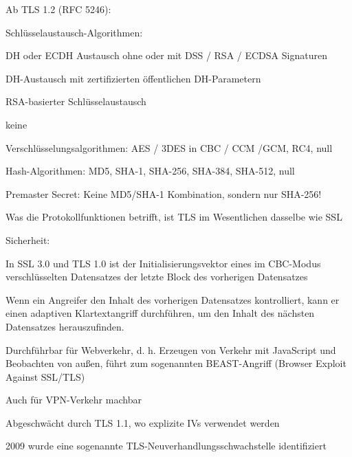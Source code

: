 \documentclass[a4paper]{article}
\begin{document}
\begin{multicols}{3}
\begin{itemize*}
            \item Ab TLS 1.2 (RFC 5246):
            \begin{itemize*}
                  \item Schlüsselaustausch-Algorithmen:
                  \begin{itemize*}
                        \item DH oder ECDH Austausch ohne oder mit DSS / RSA / ECDSA Signaturen
                        \item DH-Austausch mit zertifizierten öffentlichen DH-Parametern
                        \item RSA-basierter Schlüsselaustausch
                        \item keine
                  \end{itemize*}
                  \item Verschlüsselungsalgorithmen: AES / 3DES in CBC / CCM /GCM, RC4, null
                  \item Hash-Algorithmen: MD5, SHA-1, SHA-256, SHA-384, SHA-512, null
                  \item Premaster Secret: Keine MD5/SHA-1 Kombination, sondern nur SHA-256!
            \end{itemize*}
            \item Was die Protokollfunktionen betrifft, ist TLS im Wesentlichen dasselbe wie SSL
            \item Sicherheit:
            \begin{itemize*}
                  \item In SSL 3.0 und TLS 1.0 ist der Initialisierungsvektor eines im CBC-Modus verschlüsselten Datensatzes der letzte Block des vorherigen Datensatzes
                  \item Wenn ein Angreifer den Inhalt des vorherigen Datensatzes kontrolliert, kann er einen adaptiven Klartextangriff durchführen, um den Inhalt des nächsten Datensatzes herauszufinden.
                  \item Durchführbar für Webverkehr, d. h. Erzeugen von Verkehr mit JavaScript und Beobachten von außen, führt zum sogenannten BEAST-Angriff (Browser Exploit Against SSL/TLS)
                  \item Auch für VPN-Verkehr machbar
                  \item Abgeschwächt durch TLS 1.1, wo explizite IVs verwendet werden
                  \item 2009 wurde eine sogenannte TLS-Neuverhandlungsschwachstelle identifiziert

\end{itemize*}
\end{itemize*}
\end{multicols}
\end{document}
